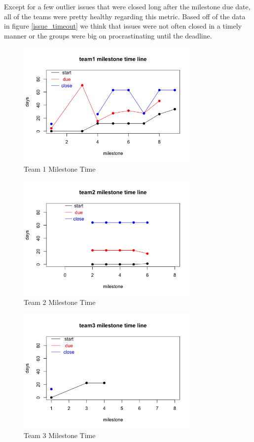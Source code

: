 \documentclass[conference]{IEEEtran}
\begin{document}
Except for a few outlier issues that were closed long after the milestone due date, all of the teams were pretty healthy regarding this metric. Based off of the data in figure \ref{issue_timeout} we think that issues were not often closed in a timely manner or the groups were big on procrastinating until the deadline. 


\begin{figure}[H]
    \centering
    \includegraphics[width=9cm]{../AprilProject/pic/team1_milestone_time.png}
    \caption{Team 1 Milestone Time}
    \label{team1_milestone_time}
\end{figure}

\begin{figure}[H]
    \centering
    \includegraphics[width=9cm]{../AprilProject/pic/team2_milestone_time.png}
    \caption{Team 2 Milestone Time}
    \label{team2_milestone_time}
\end{figure}

\begin{figure}[H]
    \centering
    \includegraphics[width=9cm]{../AprilProject/pic/team3_milestone_time.png}
    \caption{Team 3 Milestone Time}
    \label{team3_milestone_time}
\end{figure}
\end{document}
